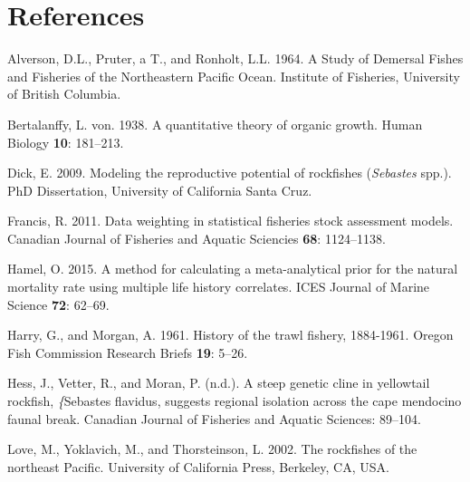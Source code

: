 \documentclass[12pt,]{article}
\begin{document}
\FloatBarrier

\FloatBarrier

\FloatBarrier

\FloatBarrier

\FloatBarrier

\FloatBarrier

\FloatBarrier

\newpage

\color{black}

\section*{References}\label{references}

\renewcommand{\thepage}{}

\hypertarget{refs}{}
\hypertarget{ref-Alverson1964}{}
Alverson, D.L., Pruter, a T., and Ronholt, L.L. 1964. A Study of
Demersal Fishes and Fisheries of the Northeastern Pacific Ocean.
Institute of Fisheries, University of British Columbia.

\hypertarget{ref-vonB1938}{}
Bertalanffy, L. von. 1938. A quantitative theory of organic growth.
Human Biology \textbf{10}: 181--213.

\hypertarget{ref-Dick2009}{}
Dick, E. 2009. Modeling the reproductive potential of rockfishes
(\emph{Sebastes} spp.). PhD Dissertation, University of California Santa
Cruz.

\hypertarget{ref-Francis2011}{}
Francis, R. 2011. Data weighting in statistical fisheries stock
assessment models. Canadian Journal of Fisheries and Aquatic Sciencies
\textbf{68}: 1124--1138.

\hypertarget{ref-Hamel2015}{}
Hamel, O. 2015. A method for calculating a meta-analytical prior for the
natural mortality rate using multiple life history correlates. ICES
Journal of Marine Science \textbf{72}: 62--69.

\hypertarget{ref-Harry1961}{}
Harry, G., and Morgan, A. 1961. History of the trawl fishery, 1884-1961.
Oregon Fish Commission Research Briefs \textbf{19}: 5--26.

\hypertarget{ref-Hess2011}{}
Hess, J., Vetter, R., and Moran, P. (n.d.). A steep genetic cline in
yellowtail rockfish, \emph{\{}Sebastes flavidus, suggests regional
isolation across the cape mendocino faunal break. Canadian Journal of
Fisheries and Aquatic Sciences: 89--104.

\hypertarget{ref-Love2002}{}
Love, M., Yoklavich, M., and Thorsteinson, L. 2002. The rockfishes of
the northeast Pacific. University of California Press, Berkeley, CA,
USA.
\end{document}
